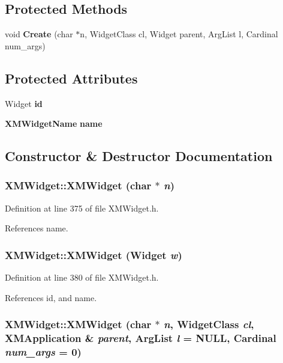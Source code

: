 \subsection*{Protected Methods}
\begin{CompactItemize}
\item 
void {\bf Create} (char $\ast$n, Widget\-Class cl, Widget parent, Arg\-List l, Cardinal num\_\-args)
\end{CompactItemize}
\subsection*{Protected Attributes}
\begin{CompactItemize}
\item 
Widget {\bf id}
\item 
{\bf XMWidget\-Name} {\bf name}
\end{CompactItemize}


\subsection{Constructor \& Destructor Documentation}
\subsubsection{\setlength{\rightskip}{0pt plus 5cm}XMWidget::XMWidget (char $\ast$ {\em n})\hspace{0.3cm}{\tt  [inline]}}\label{classXMWidget_a0}




Definition at line 375 of file XMWidget.h.

References name.
\subsubsection{\setlength{\rightskip}{0pt plus 5cm}XMWidget::XMWidget (Widget {\em w})\hspace{0.3cm}{\tt  [inline]}}\label{classXMWidget_a1}




Definition at line 380 of file XMWidget.h.

References id, and name.
\subsubsection{\setlength{\rightskip}{0pt plus 5cm}XMWidget::XMWidget (char $\ast$ {\em n}, Widget\-Class {\em cl}, {\bf XMApplication} \& {\em parent}, Arg\-List {\em l} = NULL, Cardinal {\em num\_\-args} = 0)\hspace{0.3cm}{\tt  [inline]}}\label{classXMWidget_a2}




